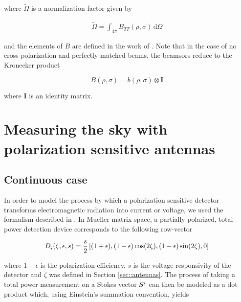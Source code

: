 \documentclass[a4paper,11pt]{article}
\begin{document}
\noindent
where $\tilde{\Omega}$ is a normalization factor given by

\begin{equation}
\begin{aligned}
\tilde{\Omega} = \int_{4\pi} B_{TT}(\rho,\sigma) \, \mathrm{d} \Omega
\end{aligned}
\end{equation}

\noindent
and the elements of $B$ are defined in the work of \cite{2007MNRAS.376.1767O}. Note that in the case of no cross polarization and perfectly matched beams, the beamsors reduce to the Kronecker product 

\begin{equation}
B(\rho,\sigma) = \mathit{b}(\rho,\sigma) \otimes \mathbf{I}{}
\end{equation}

\noindent
where $\mathbf{I}$ is an identity matrix. 

\section{Measuring the sky with polarization sensitive antennas}
\label{sec::convolution}
	
\subsection{Continuous case}

In order to model the process by which a polarization sensitive detector transforms electromagnetic radiation into current or voltage, we used the formalism described in \cite{2007A&A...470..771J}. In Mueller matrix space, a partially polarized, total power detection device corresponds to the following row-vector 

\begin{equation}
\begin{aligned}
\tensor{D}{_{i}}(\zeta,\epsilon,s) = \frac{s}{2} \left[(1 + \epsilon), (1 - \epsilon)\cos(2\zeta), (1 - \epsilon)\sin(2\zeta), 0 \right]
\end{aligned}
\label{eq::M_pol}
\end{equation}

\noindent
where $1 - \epsilon$ is the polarization efficiency, $s$ is the voltage responsivity of the detector and $\zeta$ was defined in Section \ref{sec::antennas}. The process of taking a total power measurement on a Stokes vector $\tensor{S}{^{i}}$ can then be modeled as a dot product which, using Einstein's summation convention, yields
\end{document}
